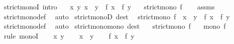 \begin{isabellebody}
\isanewline
{}\isamarkupfalse%
\ strict{\isacharunderscore}{\kern0pt}monoI\ {\isacharbrackleft}{\kern0pt}intro{\isacharquery}{\kern0pt}{\isacharbrackright}{\kern0pt}{\isacharcolon}{\kern0pt}\isanewline
\ \ \ {\isachardoublequoteopen}{\isasymAnd}x\ y{\isachardot}{\kern0pt}\ x\ {\isacharless}{\kern0pt}\ y\ {\isasymLongrightarrow}\ f\ x\ {\isacharless}{\kern0pt}\ f\ y{\isachardoublequoteclose}\isanewline
\ \ \ {\isachardoublequoteopen}strict{\isacharunderscore}{\kern0pt}mono\ f{\isachardoublequoteclose}\isanewline
%
\isadelimproof
\ \ %
\endisadelimproof
%
\isatagproof
{}\isamarkupfalse%
\ assms\ \isamarkupfalse%
\ strict{\isacharunderscore}{\kern0pt}mono{\isacharunderscore}{\kern0pt}def\ \isamarkupfalse%
\ auto%
\endisatagproof
{\isafoldproof}%
%
\isadelimproof
\isanewline
%
\endisadelimproof
\isanewline
{}\isamarkupfalse%
\ strict{\isacharunderscore}{\kern0pt}monoD\ {\isacharbrackleft}{\kern0pt}dest{\isacharquery}{\kern0pt}{\isacharbrackright}{\kern0pt}{\isacharcolon}{\kern0pt}\isanewline
\ \ {\isachardoublequoteopen}strict{\isacharunderscore}{\kern0pt}mono\ f\ {\isasymLongrightarrow}\ x\ {\isacharless}{\kern0pt}\ y\ {\isasymLongrightarrow}\ f\ x\ {\isacharless}{\kern0pt}\ f\ y{\isachardoublequoteclose}\isanewline
%
\isadelimproof
\ \ %
\endisadelimproof
%
\isatagproof
{}\isamarkupfalse%
\ strict{\isacharunderscore}{\kern0pt}mono{\isacharunderscore}{\kern0pt}def\ \isamarkupfalse%
\ auto%
\endisatagproof
{\isafoldproof}%
%
\isadelimproof
\isanewline
%
\endisadelimproof
\isanewline
{}\isamarkupfalse%
\ strict{\isacharunderscore}{\kern0pt}mono{\isacharunderscore}{\kern0pt}mono\ {\isacharbrackleft}{\kern0pt}dest{\isacharquery}{\kern0pt}{\isacharbrackright}{\kern0pt}{\isacharcolon}{\kern0pt}\isanewline
\ \ \ {\isachardoublequoteopen}strict{\isacharunderscore}{\kern0pt}mono\ f{\isachardoublequoteclose}\isanewline
\ \ \ {\isachardoublequoteopen}mono\ f{\isachardoublequoteclose}\isanewline
%
\isadelimproof
%
\endisadelimproof
%
\isatagproof
{}\isamarkupfalse%
\ {\isacharparenleft}{\kern0pt}rule\ monoI{\isacharparenright}{\kern0pt}\isanewline
\ \ \isamarkupfalse%
\ x\ y\isanewline
\ \ \isamarkupfalse%
\ {\isachardoublequoteopen}x\ {\isasymle}\ y{\isachardoublequoteclose}\isanewline
\ \ \isamarkupfalse%
\ {\isachardoublequoteopen}f\ x\ {\isasymle}\ f\ y{\isachardoublequoteclose}\isanewline

\end{isabellebody}
